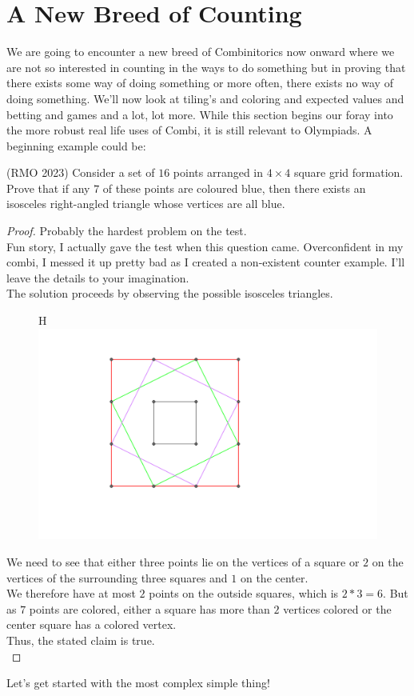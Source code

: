 \chapter{A New Breed of Counting}
We are going to encounter a new breed of Combinitorics now onward where we are not so 
interested in counting in the ways to do something but in proving that there exists 
some way of doing something or more often, there exists no way of doing something. 
We'll now look at tiling's and coloring and expected values and betting and games and a lot, 
lot more. While this section begins our foray into the more robust real life uses of Combi, 
it is still relevant to Olympiads. A beginning example could be:\\
\begin{example}
    (RMO 2023) Consider a set of $16$ points arranged in $4 \times 4$ square grid formation. Prove that if any $7$ of these points are coloured blue, then there exists an isosceles right-angled triangle whose vertices are all blue.
\end{example}
\begin{proof}
    Probably the hardest problem on the test.\\
    Fun story, I actually gave the test when this question came. Overconfident in my combi, I messed it up pretty bad as I created a non-existent counter example. I'll leave the details to your imagination.\\
    The solution proceeds by observing the possible isosceles triangles.\\
    \begin{figure}{H}
        \centering
        \includegraphics[width=0.5\linewidth]{Photos/RMO6 2023.png}
        
    \end{figure}
    We need to see that either three points lie on the vertices of a square or $2$ on the vertices of the surrounding three squares and $1$ on the center.\\
    We therefore have at most $2$ points on the outside squares, which is $2*3=6$. But as $7$ points are colored, either a square has more than $2$ vertices colored or the center square has a colored vertex.\\
    Thus, the stated claim is true.\\
\end{proof}
Let's get started with the most complex simple thing!
